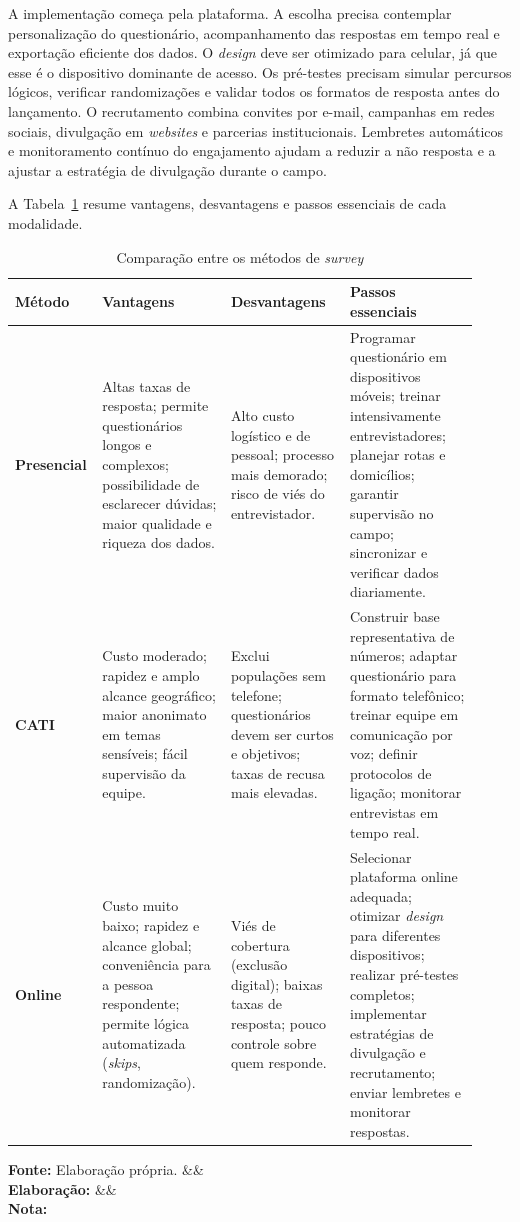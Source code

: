\documentclass[12pt, a4paper, openany]{book}
\newcommand{\figmeta}[3]{%
  \par\vspace{4pt}%
  \begin{minipage}{\linewidth}%
  \footnotesize%
  \textbf{Fonte:} #1%
  \ifx&#2&\else\\\textbf{Elabora\c{c}\~ao:} #2\fi%
  \ifx&#3&\else\\\textbf{Nota:} #3\fi%
  \end{minipage}%
  \vspace{6pt}%
}
\begin{document}
A implementa\c{c}\~ao come\c{c}a pela plataforma. A escolha precisa contemplar personaliza\c{c}\~ao do question\'ario, acompanhamento das respostas em tempo real e exporta\c{c}\~ao eficiente dos dados. O \textit{design} deve ser otimizado para celular, j\'a que esse \'e o dispositivo dominante de acesso. Os pr\'e-testes precisam simular percursos l\'ogicos, verificar randomiza\c{c}\~oes e validar todos os formatos de resposta antes do lan\c{c}amento. O recrutamento combina convites por e-mail, campanhas em redes sociais, divulga\c{c}\~ao em \textit{websites} e parcerias institucionais. Lembretes autom\'aticos e monitoramento cont\'inuo do engajamento ajudam a reduzir a n\~ao resposta e a ajustar a estrat\'egia de divulga\c{c}\~ao durante o campo.

A Tabela~\ref{tab:comparacao_surveys} resume vantagens, desvantagens e passos essenciais de cada modalidade.

\begin{table}[H]
\centering
\caption{Compara\c{c}\~ao entre os m\'etodos de \textit{survey}}
\label{tab:comparacao_surveys}
\small
\begin{tabular}{p{0.13\linewidth} p{0.27\linewidth} p{0.25\linewidth} p{0.27\linewidth}}
\toprule
\textbf{M\'etodo} & \textbf{Vantagens} & \textbf{Desvantagens} & \textbf{Passos essenciais} \\
\midrule
\textbf{Presencial} &
Altas taxas de resposta; permite question\'arios longos e complexos; possibilidade de esclarecer d\'uvidas; maior qualidade e riqueza dos dados. &
Alto custo log\'istico e de pessoal; processo mais demorado; risco de vi\'es do entrevistador. &
Programar question\'ario em dispositivos m\'oveis; treinar intensivamente entrevistadores; planejar rotas e domic\'ilios; garantir supervis\~ao no campo; sincronizar e verificar dados diariamente. \\
\midrule
\textbf{CATI} &
Custo moderado; rapidez e amplo alcance geogr\'afico; maior anonimato em temas sens\'iveis; f\'acil supervis\~ao da equipe. &
Exclui popula\c{c}\~oes sem telefone; question\'arios devem ser curtos e objetivos; taxas de recusa mais elevadas. &
Construir base representativa de n\'umeros; adaptar question\'ario para formato telef\^onico; treinar equipe em comunica\c{c}\~ao por voz; definir protocolos de liga\c{c}\~ao; monitorar entrevistas em tempo real. \\
\midrule
\textbf{Online} &
Custo muito baixo; rapidez e alcance global; conveni\^encia para a pessoa respondente; permite l\'ogica automatizada (\textit{skips}, randomiza\c{c}\~ao). &
Vi\'es de cobertura (exclus\~ao digital); baixas taxas de resposta; pouco controle sobre quem responde. &
Selecionar plataforma online adequada; otimizar \textit{design} para diferentes dispositivos; realizar pr\'e-testes completos; implementar estrat\'egias de divulga\c{c}\~ao e recrutamento; enviar lembretes e monitorar respostas. \\
\bottomrule
\end{tabular}
\figmeta{Elabora\c{c}\~ao pr\'opria.}{}{}
\end{table}
\end{document}

